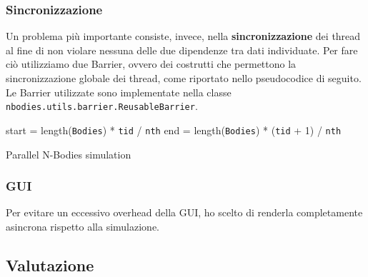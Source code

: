 \documentclass[12pt,a4paper,oneside]{article}
\begin{document}
	\subsubsection{Sincronizzazione}
	Un problema più importante consiste, invece, nella \textbf{sincronizzazione} dei thread al fine di non violare nessuna delle due dipendenze tra dati individuate. Per fare ciò utilizziamo due Barrier, ovvero dei costrutti che permettono la sincronizzazione globale dei thread, come riportato nello pseudocodice di seguito. Le Barrier utilizzate sono implementate nella classe \texttt{nbodies.utils.barrier.ReusableBarrier}.
	
	\begin{algorithm}
		
		start = length(\texttt{Bodies}) * \texttt{tid} / \texttt{nth}\;
		end = length(\texttt{Bodies}) * (\texttt{tid} + 1) / \texttt{nth}\;
		\caption{Parallel N-Bodies simulation}
		\label{alg:sim-barrier}
	\end{algorithm}

	\subsubsection{GUI}
	Per evitare un eccessivo overhead della GUI, ho scelto di renderla completamente asincrona rispetto alla simulazione.
	
	\subsection{Valutazione}
\end{document}

